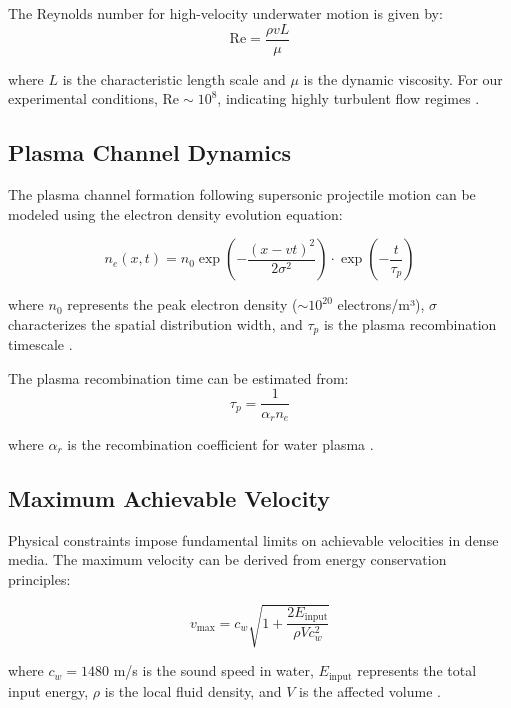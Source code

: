 \documentclass[12pt,a4paper]{article}
\begin{document}
The Reynolds number for high-velocity underwater motion is given by:
\begin{equation}
\text{Re} = \frac{\rho v L}{\mu}
\label{eq:reynolds}
\end{equation}

where $L$ is the characteristic length scale and $\mu$ is the dynamic viscosity. For our experimental conditions, $\text{Re} \sim 10^8$, indicating highly turbulent flow regimes \cite{pope2000turbulent}.

\subsection{Plasma Channel Dynamics}

The plasma channel formation following supersonic projectile motion can be modeled using the electron density evolution equation:

\begin{equation}
n_e(x,t) = n_0 \exp\left(-\frac{(x-vt)^2}{2\sigma^2}\right) \cdot \exp\left(-\frac{t}{\tau_p}\right)
\label{eq:plasma_density}
\end{equation}

where $n_0$ represents the peak electron density ($\sim 10^{20}$ electrons/m³), $\sigma$ characterizes the spatial distribution width, and $\tau_p$ is the plasma recombination timescale \cite{lieberman2005principles}.

The plasma recombination time can be estimated from:
\begin{equation}
\tau_p = \frac{1}{\alpha_r n_e}
\label{eq:recombination_time}
\end{equation}

where $\alpha_r$ is the recombination coefficient for water plasma \cite{fridman2008plasma}.

\subsection{Maximum Achievable Velocity}

Physical constraints impose fundamental limits on achievable velocities in dense media. The maximum velocity can be derived from energy conservation principles:

\begin{equation}
v_{\max} = c_w\sqrt{1 + \frac{2E_{\text{input}}}{\rho V c_w^2}}
\label{eq:max_velocity}
\end{equation}

where $c_w = 1480$ m/s is the sound speed in water, $E_{\text{input}}$ represents the total input energy, $\rho$ is the local fluid density, and $V$ is the affected volume \cite{landau1987fluid}.
\end{document}
